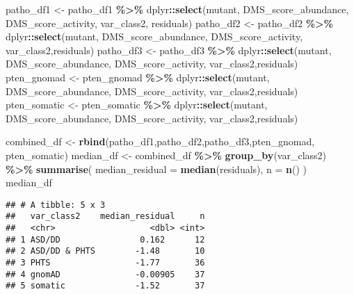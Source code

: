 \documentclass[
]{article}
\newenvironment{Shaded}{\begin{snugshade}}{\end{snugshade}}
\newcommand{\AttributeTok}[1]{\textcolor[rgb]{0.13,0.29,0.53}{#1}}
\newcommand{\FunctionTok}[1]{\textcolor[rgb]{0.13,0.29,0.53}{\textbf{#1}}}
\newcommand{\NormalTok}[1]{#1}
\newcommand{\OtherTok}[1]{\textcolor[rgb]{0.56,0.35,0.01}{#1}}
\newcommand{\SpecialCharTok}[1]{\textcolor[rgb]{0.81,0.36,0.00}{\textbf{#1}}}
\begin{document}
\begin{Shaded}
\begin{Highlighting}[]
\NormalTok{patho\_df1 }\OtherTok{\textless{}{-}}\NormalTok{ patho\_df1 }\SpecialCharTok{\%\textgreater{}\%}\NormalTok{ dplyr}\SpecialCharTok{::}\FunctionTok{select}\NormalTok{(mutant, DMS\_score\_abundance, DMS\_score\_activity, var\_class2, residuals)}
\NormalTok{patho\_df2 }\OtherTok{\textless{}{-}}\NormalTok{ patho\_df2 }\SpecialCharTok{\%\textgreater{}\%}\NormalTok{ dplyr}\SpecialCharTok{::}\FunctionTok{select}\NormalTok{(mutant, DMS\_score\_abundance, DMS\_score\_activity, var\_class2,residuals)}
\NormalTok{patho\_df3 }\OtherTok{\textless{}{-}}\NormalTok{ patho\_df3 }\SpecialCharTok{\%\textgreater{}\%}\NormalTok{ dplyr}\SpecialCharTok{::}\FunctionTok{select}\NormalTok{(mutant, DMS\_score\_abundance, DMS\_score\_activity, var\_class2,residuals)}
\NormalTok{pten\_gnomad }\OtherTok{\textless{}{-}}\NormalTok{ pten\_gnomad }\SpecialCharTok{\%\textgreater{}\%}\NormalTok{ dplyr}\SpecialCharTok{::}\FunctionTok{select}\NormalTok{(mutant, DMS\_score\_abundance, DMS\_score\_activity, var\_class2,residuals)}
\NormalTok{pten\_somatic }\OtherTok{\textless{}{-}}\NormalTok{ pten\_somatic }\SpecialCharTok{\%\textgreater{}\%}\NormalTok{ dplyr}\SpecialCharTok{::}\FunctionTok{select}\NormalTok{(mutant, DMS\_score\_abundance, DMS\_score\_activity, var\_class2,residuals)}
\end{Highlighting}
\end{Shaded}

\begin{Shaded}
\begin{Highlighting}[]
\NormalTok{combined\_df }\OtherTok{\textless{}{-}} \FunctionTok{rbind}\NormalTok{(patho\_df1,patho\_df2,patho\_df3,pten\_gnomad, pten\_somatic)}
\NormalTok{median\_df }\OtherTok{\textless{}{-}}\NormalTok{ combined\_df }\SpecialCharTok{\%\textgreater{}\%}
  \FunctionTok{group\_by}\NormalTok{(var\_class2) }\SpecialCharTok{\%\textgreater{}\%}
  \FunctionTok{summarise}\NormalTok{(}
    \AttributeTok{median\_residual =} \FunctionTok{median}\NormalTok{(residuals),}
    \AttributeTok{n =} \FunctionTok{n}\NormalTok{()}
\NormalTok{  )}
\NormalTok{median\_df}
\end{Highlighting}
\end{Shaded}

\begin{verbatim}
## # A tibble: 5 x 3
##   var_class2    median_residual     n
##   <chr>                   <dbl> <int>
## 1 ASD/DD                0.162      12
## 2 ASD/DD & PHTS        -1.48       10
## 3 PHTS                 -1.77       36
## 4 gnomAD               -0.00905    37
## 5 somatic              -1.52       37
\end{verbatim}
\end{document}
